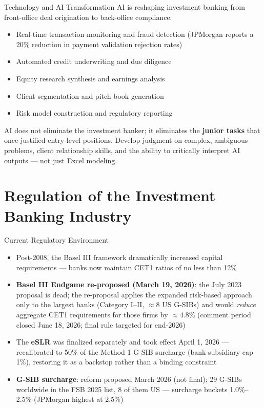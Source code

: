\documentclass[aspectratio=169]{beamer}
\begin{document}
\begin{frame}{Technology and AI Transformation}
AI is reshaping investment banking from front-office deal origination to back-office compliance:
\begin{itemize}
  \item Real-time transaction monitoring and fraud detection (JPMorgan reports a 20\% reduction in payment validation rejection rates)
  \item Automated credit underwriting and due diligence
  \item Equity research synthesis and earnings analysis
  \item Client segmentation and pitch book generation
  \item Risk model construction and regulatory reporting
\end{itemize}
\vspace{0.2em}
AI does not eliminate the investment banker; it eliminates the \textbf{junior tasks} that once justified entry-level positions. Develop judgment on complex, ambiguous problems, client relationship skills, and the ability to critically interpret AI outputs --- not just Excel modeling.
\end{frame}


\section{Regulation of the Investment Banking Industry}

\begin{frame}{Current Regulatory Environment}
\begin{itemize}
  \item Post-2008, the Basel III framework dramatically increased capital requirements --- banks now maintain CET1 ratios of no less than 12\%
  \item \textbf{Basel III Endgame re-proposed (March 19, 2026)}: the July 2023 proposal is dead; the re-proposal applies the expanded risk-based approach only to the largest banks (Category I--II, $\approx$8 US G-SIBs) and would \emph{reduce} aggregate CET1 requirements for those firms by $\approx$4.8\% (comment period closed June 18, 2026; final rule targeted for end-2026)
  \item The \textbf{eSLR} was finalized separately and took effect April 1, 2026 --- recalibrated to 50\% of the Method 1 G-SIB surcharge (bank-subsidiary cap 1\%), restoring it as a backstop rather than a binding constraint
  \item \textbf{G-SIB surcharge}: reform proposed March 2026 (not final); 29 G-SIBs worldwide in the FSB 2025 list, 8 of them US --- surcharge buckets 1.0\%--2.5\% (JPMorgan highest at 2.5\%)
\end{itemize}
\end{frame}
\end{document}
